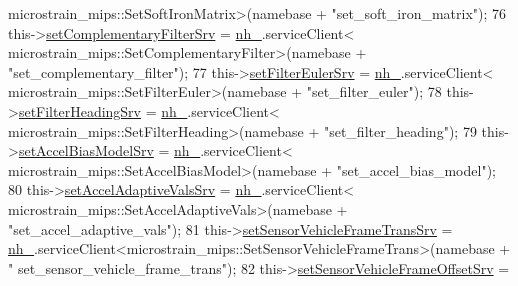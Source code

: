 \begin{DoxyCode}
      microstrain\_mips::SetSoftIronMatrix>(namebase + \textcolor{stringliteral}{"set\_soft\_iron\_matrix"});
76                 this->\hyperlink{classcl__microstrain__mips__client_1_1ClMicrostainMips_a5b6fa2b712961f36c2a2603315dc4751}{setComplementaryFilterSrv} = \hyperlink{classcl__microstrain__mips__client_1_1ClMicrostainMips_a0892aa9866da5689621b8d4793661360}{nh\_}.serviceClient<
      microstrain\_mips::SetComplementaryFilter>(namebase + \textcolor{stringliteral}{"set\_complementary\_filter"});
77                 this->\hyperlink{classcl__microstrain__mips__client_1_1ClMicrostainMips_a0103ee9a366927018fa5afcddd9ed977}{setFilterEulerSrv} = \hyperlink{classcl__microstrain__mips__client_1_1ClMicrostainMips_a0892aa9866da5689621b8d4793661360}{nh\_}.serviceClient<
      microstrain\_mips::SetFilterEuler>(namebase + \textcolor{stringliteral}{"set\_filter\_euler"});
78                 this->\hyperlink{classcl__microstrain__mips__client_1_1ClMicrostainMips_a23f9cbec5a5f86c3ca9fb4781dbf198b}{setFilterHeadingSrv} = \hyperlink{classcl__microstrain__mips__client_1_1ClMicrostainMips_a0892aa9866da5689621b8d4793661360}{nh\_}.serviceClient<
      microstrain\_mips::SetFilterHeading>(namebase + \textcolor{stringliteral}{"set\_filter\_heading"});
79                 this->\hyperlink{classcl__microstrain__mips__client_1_1ClMicrostainMips_a3c834f448cc214e1f23a8ea5ef677753}{setAccelBiasModelSrv} = \hyperlink{classcl__microstrain__mips__client_1_1ClMicrostainMips_a0892aa9866da5689621b8d4793661360}{nh\_}.serviceClient<
      microstrain\_mips::SetAccelBiasModel>(namebase + \textcolor{stringliteral}{"set\_accel\_bias\_model"});
80                 this->\hyperlink{classcl__microstrain__mips__client_1_1ClMicrostainMips_a0c31de547137c43fb1f8325032effe28}{setAccelAdaptiveValsSrv} = \hyperlink{classcl__microstrain__mips__client_1_1ClMicrostainMips_a0892aa9866da5689621b8d4793661360}{nh\_}.serviceClient<
      microstrain\_mips::SetAccelAdaptiveVals>(namebase + \textcolor{stringliteral}{"set\_accel\_adaptive\_vals"});
81                 this->\hyperlink{classcl__microstrain__mips__client_1_1ClMicrostainMips_a8c6e0b7c587d19f9424e40420f6ed8fc}{setSensorVehicleFrameTransSrv} = 
      \hyperlink{classcl__microstrain__mips__client_1_1ClMicrostainMips_a0892aa9866da5689621b8d4793661360}{nh\_}.serviceClient<microstrain\_mips::SetSensorVehicleFrameTrans>(namebase + \textcolor{stringliteral}{"
      set\_sensor\_vehicle\_frame\_trans"});
82                 this->\hyperlink{classcl__microstrain__mips__client_1_1ClMicrostainMips_aa04c70e0ed33354a79183e58c0a6b562}{setSensorVehicleFrameOffsetSrv} = 

\end{DoxyCode}
